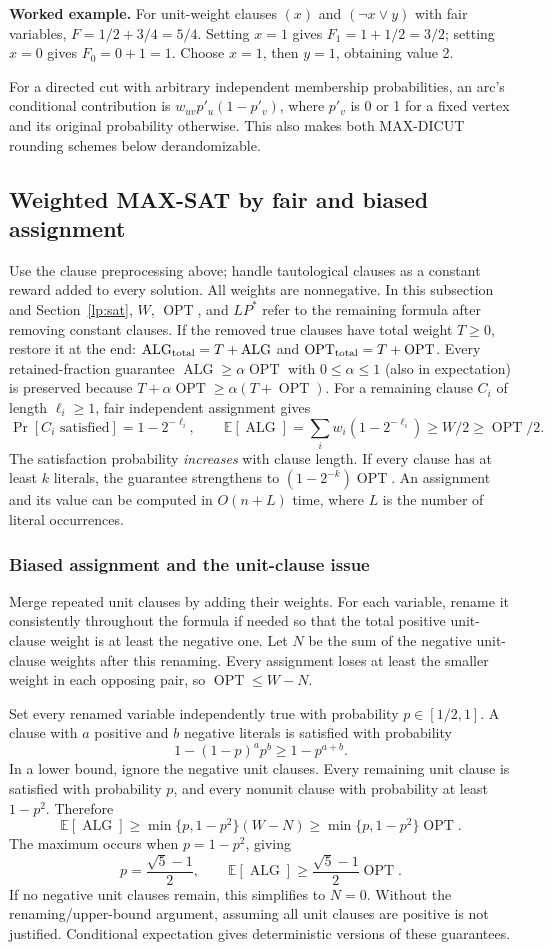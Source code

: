 \documentclass[10pt]{article}
\theoremstyle{definition}
\newcommand{\OPT}{\operatorname{OPT}}
\newcommand{\ALG}{\operatorname{ALG}}
\begin{document}
\textbf{Worked example.}
For unit-weight clauses $(x)$ and $(\neg x\lor y)$ with fair variables,
$F=1/2+3/4=5/4$. Setting $x=1$ gives $F_1=1+1/2=3/2$; setting $x=0$
gives $F_0=0+1=1$. Choose $x=1$, then $y=1$, obtaining value 2.

For a directed cut with arbitrary independent membership probabilities,
an arc's conditional contribution is $w_{uv}p'_u(1-p'_v)$, where $p'_v$ is
0 or 1 for a fixed vertex and its original probability otherwise.
This also makes both MAX-DICUT rounding schemes below derandomizable.

\subsection{Weighted MAX-SAT by fair and biased assignment}\label{ra:sat}
Use the clause preprocessing above; handle tautological clauses as a constant
reward added to every solution. All weights are nonnegative. In this
subsection and Section~\ref{lp:sat}, $W$, $\OPT$, and $LP^*$ refer to the
remaining formula after removing constant clauses. If the removed true
clauses have total weight $T\ge0$, restore it at the end:
$\ALG_{\rm total}=T+\ALG$ and $\OPT_{\rm total}=T+\OPT$.
Every retained-fraction guarantee $\ALG\ge\alpha\OPT$ with $0\le\alpha\le1$
(also in expectation) is preserved because
$T+\alpha\OPT\ge\alpha(T+\OPT)$.
For a remaining
clause $C_i$ of length $\ell_i\ge1$, fair independent assignment gives
\[
  \Pr[C_i\text{ satisfied}]=1-2^{-\ell_i},\qquad
  \mathbb E[\ALG]=\sum_iw_i(1-2^{-\ell_i})\ge W/2\ge\OPT/2.
\]
The satisfaction probability \emph{increases} with clause length. If every
clause has at least $k$ literals, the guarantee strengthens to
$(1-2^{-k})\OPT$. An assignment and its value can be computed in $O(n+L)$
time, where $L$ is the number of literal occurrences.

\subsubsection*{Biased assignment and the unit-clause issue}
Merge repeated unit clauses by adding their weights. For each variable,
rename it consistently throughout the formula if needed so that the total
positive unit-clause weight is at least the negative one. Let $N$ be the sum
of the negative unit-clause weights after this renaming. Every assignment
loses at least the smaller weight in each opposing pair, so
$\OPT\le W-N$.

Set every renamed variable independently true with probability
$p\in[1/2,1]$. A clause with $a$ positive and $b$ negative literals is
satisfied with probability
\[
  1-(1-p)^a p^b\ge1-p^{a+b}.
\]
In a lower bound, ignore the negative unit clauses. Every remaining unit
clause is satisfied with probability $p$, and every nonunit clause with
probability at least $1-p^2$. Therefore
\[
  \mathbb E[\ALG]\ge\min\{p,1-p^2\}(W-N)
    \ge\min\{p,1-p^2\}\OPT.
\]
The maximum occurs when $p=1-p^2$, giving
\[
  p=\frac{\sqrt5-1}{2},\qquad
  \mathbb E[\ALG]\ge\frac{\sqrt5-1}{2}\OPT.
\]
If no negative unit clauses remain, this simplifies to $N=0$.
Without the renaming/upper-bound argument, assuming all unit clauses are
positive is not justified. Conditional expectation gives deterministic
versions of these guarantees.
\end{document}
